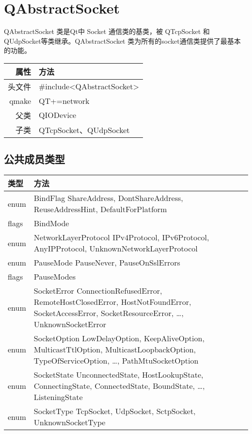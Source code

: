 \chapter{QAbstractSocket}

QAbstractSocket 类是Qt中 Socket 通信类的基类，被 QTcpSocket 和
QUdpSocket等类继承。QAbstractSocket 类为所有的socket通信类提供了最基本
的功能。

\begin{tabular}{|r|l|}
	\hline
	属性 & 方法 \\
  \hline
	头文件 & \#include<QAbstractSocket>\\      
	\hline
	qmake & QT+=network\\      
	\hline
	父类 & QIODevice\\
	\hline
	子类 & QTcpSocket、QUdpSocket \\
	\hline
\end{tabular}

\section{公共成员类型}

\begin{tabular}{|m{5em}|m{35em}|}
\hline
类型&方法 \\ 
\hline
enum&	BindFlag { ShareAddress, DontShareAddress, ReuseAddressHint,
      DefaultForPlatform }\\
\hline
flags&	BindMode\\
\hline
enum&	NetworkLayerProtocol{ IPv4Protocol, IPv6Protocol, AnyIPProtocol, UnknownNetworkLayerProtocol }\\
\hline
enum&	PauseMode { PauseNever, PauseOnSslErrors }\\
\hline
flags&	PauseModes\\
\hline
enum&	SocketError { ConnectionRefusedError, RemoteHostClosedError, HostNotFoundError, SocketAccessError, SocketResourceError, …, UnknownSocketError }\\
\hline
enum&	SocketOption{ LowDelayOption, KeepAliveOption, MulticastTtlOption, MulticastLoopbackOption, TypeOfServiceOption, …, PathMtuSocketOption }\\
\hline
enum&	SocketState { UnconnectedState, HostLookupState, ConnectingState, ConnectedState, BoundState, …, ListeningState }\\
\hline
enum&	SocketType { TcpSocket, UdpSocket, SctpSocket, UnknownSocketType }\\
  \hline
\end{tabular}

